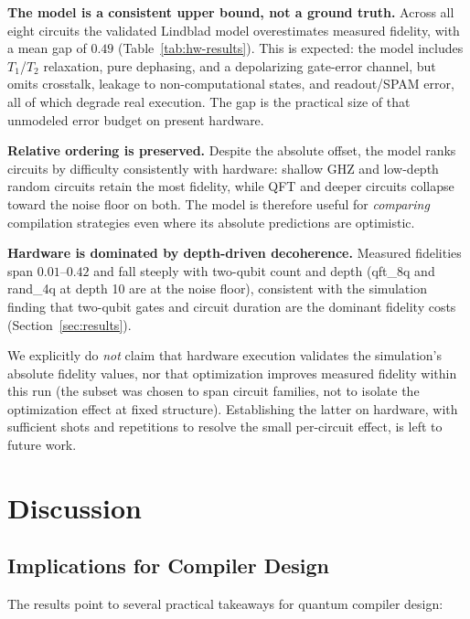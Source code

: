 \documentclass[sigconf,nonacm]{acmart}
\begin{document}
\textbf{The model is a consistent upper bound, not a ground truth.} Across all eight circuits the validated Lindblad model overestimates measured fidelity, with a mean gap of $0.49$ (Table~\ref{tab:hw-results}). This is expected: the model includes $T_1$/$T_2$ relaxation, pure dephasing, and a depolarizing gate-error channel, but omits crosstalk, leakage to non-computational states, and readout/SPAM error, all of which degrade real execution. The gap is the practical size of that unmodeled error budget on present hardware.

\textbf{Relative ordering is preserved.} Despite the absolute offset, the model ranks circuits by difficulty consistently with hardware: shallow GHZ and low-depth random circuits retain the most fidelity, while QFT and deeper circuits collapse toward the noise floor on both. The model is therefore useful for \emph{comparing} compilation strategies even where its absolute predictions are optimistic.

\textbf{Hardware is dominated by depth-driven decoherence.} Measured fidelities span $0.01$--$0.42$ and fall steeply with two-qubit count and depth (qft\_8q and rand\_4q at depth 10 are at the noise floor), consistent with the simulation finding that two-qubit gates and circuit duration are the dominant fidelity costs (Section~\ref{sec:results}).

We explicitly do \emph{not} claim that hardware execution validates the simulation's absolute fidelity values, nor that optimization improves measured fidelity within this run (the subset was chosen to span circuit families, not to isolate the optimization effect at fixed structure). Establishing the latter on hardware, with sufficient shots and repetitions to resolve the small per-circuit effect, is left to future work.

\section{Discussion}
\label{sec:discussion}

\subsection{Implications for Compiler Design}

The results point to several practical takeaways for quantum compiler design:
\end{document}
